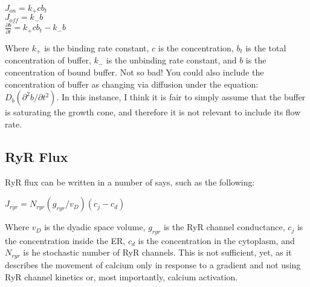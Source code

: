 \documentclass[12pt]{amsart}
\begin{document}
\begin{center}

    $J_{on} = k_+cb_t$\\
    $J_{off} = k_-b$\\
    $\frac{\partial b}{\partial t} =  k_+cb_t - k_-b$
    
\end{center}
\bigskip

Where $k_+$ is the binding rate constant, $c$ is the concentration, $b_t$ is the total concentration of buffer, $k_-$ is the unbinding rate constant, and $b$ is the concentration of bound buffer. Not so bad! You could also include the concentration of buffer as changing via diffusion under the  equation: $D_b(\partial^2 b / \partial t^2)$. In this instance, I think it is fair to simply assume that the buffer is saturating the growth cone, and therefore it is not relevant to include its flow rate. 

\subsection{RyR Flux} RyR flux can be written in a number of says, such as the following: 

\bigskip

\begin{center}

    $J_{ryr} = N_{ryr}(g_{ryr}/v_D)(c_j - c_d)$
    
\end{center}

\bigskip

Where $v_D$ is the dyadic space volume, $g_{ryr}$ is the RyR channel conductance, $c_j$ is the concentration inside the ER, $c_d$ is the concentration in the cytoplasm, and $N_{ryr}$ is he stochastic number of RyR channels. This is not sufficient, yet, as it describes the movement of calcium only in response to a gradient and not using RyR channel kinetics or, most importantly, calcium activation. 
\end{document}
